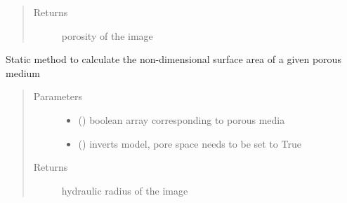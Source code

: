 \documentclass[letterpaper,10pt,english]{sphinxmanual}
\begin{document}
\begin{fulllineitems}
\begin{fulllineitems}
\begin{quote}
\begin{description}
\begin{itemize}
\end{itemize}

\item[{Returns}] \leavevmode
porosity of the image

\end{description}\end{quote}

\end{fulllineitems}


\begin{fulllineitems}
\label{\detokenize{index:lb_colloids.utilities.psphere.PSphere.static_surface_area}}
Static method to calculate the non-dimensional surface
area of a given porous medium
\begin{quote}\begin{description}
\item[{Parameters}] \leavevmode\begin{itemize}
\item {} 
 () \textendash{} boolean array corresponding to porous media

\item {} 
 () \textendash{} inverts model, pore space needs to be set to True

\end{itemize}

\item[{Returns}] \leavevmode
hydraulic radius of the image

\end{description}\end{quote}

\end{fulllineitems}


\end{fulllineitems}
\end{document}
